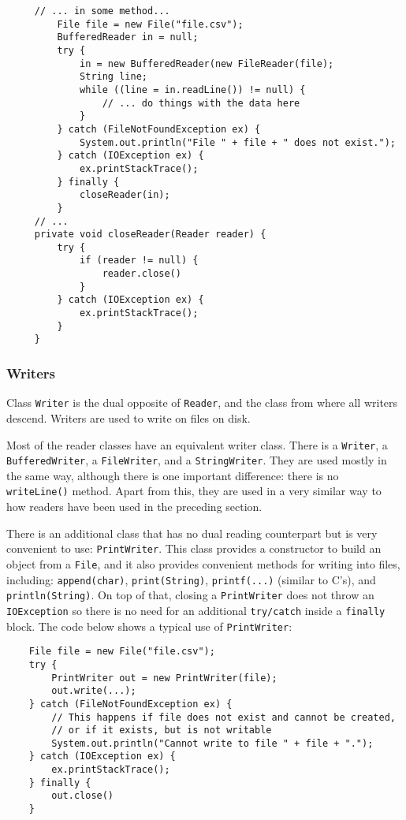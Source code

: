 \begin{verbatim}
     // ... in some method...
         File file = new File("file.csv");
         BufferedReader in = null;
         try {
             in = new BufferedReader(new FileReader(file); 
             String line;
             while ((line = in.readLine()) != null) {
                 // ... do things with the data here
             }
         } catch (FileNotFoundException ex) {
             System.out.println("File " + file + " does not exist.");
         } catch (IOException ex) {
             ex.printStackTrace();
         } finally { 
             closeReader(in);
         }
     // ...
     private void closeReader(Reader reader) { 
         try {
             if (reader != null) {
                 reader.close()
             }
         } catch (IOException ex) {
             ex.printStackTrace();
         }
     }        
\end{verbatim}

\subsubsection{Writers}
\label{sec:writers}

Class \verb+Writer+ is the dual opposite of \verb+Reader+, and the
class from where all writers descend. Writers are used to write on
files on disk. 

Most of the reader classes have an equivalent writer class. There is a
\verb+Writer+, a \verb+BufferedWriter+, a \verb+FileWriter+, and a
\verb+StringWriter+. They are used mostly in the same way, although
there is one important difference: there is no \verb+writeLine()+
method. Apart from this, they are used in a very similar way to how
readers have been used in the preceding section. 

There is an additional class that has no dual reading counterpart but
is very convenient to use: \verb+PrintWriter+. This class provides a
constructor to build an object from a \verb+File+, and it also provides 
convenient methods for writing into files, including: 
\verb+append(char)+, 
\verb+print(String)+, 
\verb+printf(...)+ (similar to C's), 
and 
\verb+println(String)+. On top of that, closing a \verb+PrintWriter+
does not throw an \verb+IOException+ so there is no need for an
additional \verb+try/catch+ inside a \verb+finally+ block. 
The code below shows a typical use of \verb+PrintWriter+: 

\begin{verbatim}
    File file = new File("file.csv");
    try {
        PrintWriter out = new PrintWriter(file); 
        out.write(...);
    } catch (FileNotFoundException ex) {
        // This happens if file does not exist and cannot be created, 
        // or if it exists, but is not writable
        System.out.println("Cannot write to file " + file + ".");
    } catch (IOException ex) {
        ex.printStackTrace();
    } finally { 
        out.close()
    }    
\end{verbatim}

